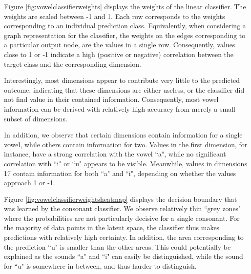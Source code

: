 		Figure \ref{fig:vowelclassifierweights} displays the weights of the linear classifier. The weights are scaled between -1 and 1. Each row corresponds to the weights corresponding to an individual prediction class. Equivalently, when considering a graph representation for the classifier, the weights on the edges corresponding to a particular output node, are the values in a single row. Consequently, values close to 1 or -1 indicate a high (positive or negative) correlation between the target class and the corresponding dimension. 
		
		Interestingly, most dimensions appear to contribute very little to the predicted outcome, indicating that these dimensions are either useless, or the classifier did not find value in their contained information. Consequently, most vowel information can be derived with relatively high accuracy from merely a small subset of dimensions. 
		
		In addition, we observe that certain dimensions contain information for a single vowel, while others contain information for two. Values in the first dimension, for instance, have a strong correlation with the vowel ``a", while no significant correlation with ``i" or ``u" appears to be visible. Meanwhile, values in dimensions 17 contain information for both ``a" and ``i", depending on whether the values approach 1 or -1.
		
		Figure \ref{fig:vowelclassifierweightsheatmap} displays the decision boundary that was learned by the consonant classifier. We observe relatively thin ``grey zones" where the probabilities are not particularly decisive for a single consonant. For the majority of data points in the latent space, the classifier thus makes predictions with relatively high certainty. In addition, the area corresponding to the prediction ``u" is smaller than the other areas. This could potentially be explained as the sounds ``a" and ``i" can easily be distinguished, while the sound for ``u" is somewhere in between, and thus harder to distinguish.
		
		
		
		
		
